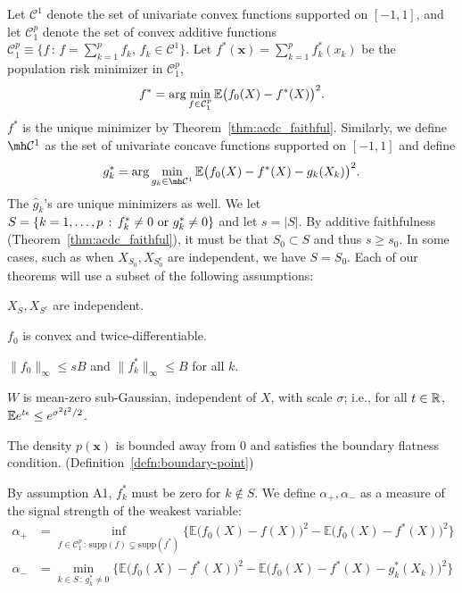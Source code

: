 Let $\mathcal{C}^1$ denote the set of univariate convex functions
supported on $[-1,1]$, 
and let  $\mathcal{C}_1^{p}$ denote the set of convex additive functions
$\mathcal{C}_1^p \equiv \{ f \,:\, f = \sum_{k=1}^p f_k, \,
   f_k \in \mathcal{C}^1 \} $.  
Let $f^*(\mathbf{x}) = \sum_{k=1}^p f^*_k(x_k)$ be the population risk
minimizer in $\mathcal{C}_1^p$, 
\begin{equation}
f^* = \arg\min_{f \in \mathcal{C}_1^p} {\mathbb E}\big(f_0(X) - f^*(X)
\big)^2.
\end{equation}
$f^*$ is the unique minimizer by Theorem~\ref{thm:acdc_faithful}. Similarly, we define $\mh \mathcal{C}^1$ as the set of univariate concave functions supported on $[-1, 1]$ and define
\begin{equation}
g^*_k = \arg\min_{g_k \in \mh \mathcal{C}^1} \E \big( f_0(X) - f^*(X)
- g_k(X_k) \big)^2.
\end{equation}
The $\hat{g}_k$'s are unique minimizers as well. We let $S = \{ k = 1,\ldots,p \,:\, f^*_k \neq 0 \textrm{ or } g^*_k \neq 0\}$ and let $s = |S|$. By additive faithfulness (Theorem~\ref{thm:acdc_faithful}), it must be that $S_0 \subset S$ and thus $s \geq s_0$. In some cases, such as when $X_{S_0}, X_{S^c_0}$ are independent, we have $S = S_0$.
Each of our theorems will use a subset of the following assumptions:
\begin{packed_enum}
\item[A1:] $X_S, X_{S^c}$ are independent. 
\item[A2:] $f_0$ is convex and twice-differentiable. 
\item[A3:] $\|f_0\|_\infty \leq sB$ and $\| f^*_k \|_\infty \leq B$ for all $k$.
\item[A4:] $W$ is mean-zero sub-Gaussian, independent of $X$, with scale $\sigma$; i.e., for all $t \in {\mathbb R}$, ${\mathbb E} e^{t \epsilon} \leq e^{\sigma^2 t^2 / 2}$.
\item[A5:] The density $p(\mathbf{x})$ is bounded away from 0 and satisfies the boundary flatness condition. (Definition~\ref{defn:boundary-point})
\end{packed_enum}
By assumption A1, $f^*_k$ must be zero for $k\notin S$.
We define $\alpha_{+}, \alpha_{-}$ as a measure of the signal strength of the weakest variable:
\begin{align}
\alpha_{+} &= \inf_{f \in \mathcal{C}_1^p \,:\, \textrm{supp}(f) \subsetneq \textrm{supp}(f^*)} 
       \Big\{ \mathbb{E} \big( f_0(X) - f(X) \big)^2 - 
        \mathbb{E} \big( f_0(X) - f^*(X) \big)^2  \Big\} \label{eqn:signal_level_defn} \\
\alpha_{-} &=   \min_{k \in S \,:\, g^*_k \neq 0}
      \Big\{ \mathbb{E} \big( f_0(X) - f^*(X) \big)^2 - 
    \mathbb{E} \big( f_0(X) - f^*(X) - g^*_k(X_k) \big)^2 \Big\} \nonumber
\end{align}
